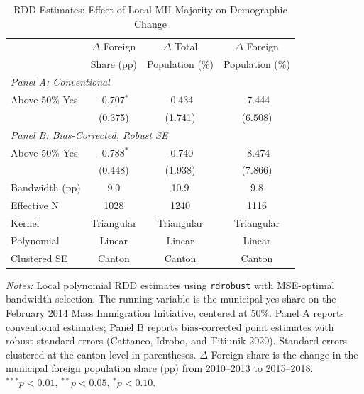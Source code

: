 \begin{table}[t]
\centering
\caption{RDD Estimates: Effect of Local MII Majority on Demographic Change}
\label{tab:main}
\begin{tabular}{lccc}
\hline\hline
 & $\Delta$ Foreign & $\Delta$ Total & $\Delta$ Foreign \\
 & Share (pp) & Population (\%) & Population (\%) \\
\hline
\multicolumn{4}{l}{\textit{Panel A: Conventional}} \\
[4pt]
Above 50\% Yes & -0.707$^{*}$ & -0.434 & -7.444 \\
 & (0.375) & (1.741) & (6.508) \\
[8pt]
\multicolumn{4}{l}{\textit{Panel B: Bias-Corrected, Robust SE}} \\
[4pt]
Above 50\% Yes & -0.788$^{*}$ & -0.740 & -8.474 \\
 & (0.448) & (1.938) & (7.866) \\
[4pt]
\hline
Bandwidth (pp) & 9.0 & 10.9 & 9.8 \\
Effective N & 1028 & 1240 & 1116 \\
Kernel & Triangular & Triangular & Triangular \\
Polynomial & Linear & Linear & Linear \\
Clustered SE & Canton & Canton & Canton \\
\hline\hline
\end{tabular}
\begin{tablenotes}[flushleft]
\small
\item \textit{Notes:} Local polynomial RDD estimates using \texttt{rdrobust} with MSE-optimal bandwidth selection. The running variable is the municipal yes-share on the February 2014 Mass Immigration Initiative, centered at 50\%. Panel A reports conventional estimates; Panel B reports bias-corrected point estimates with robust standard errors (Cattaneo, Idrobo, and Titiunik 2020). Standard errors clustered at the canton level in parentheses. $\Delta$ Foreign share is the change in the municipal foreign population share (pp) from 2010--2013 to 2015--2018. $^{***}p<0.01$, $^{**}p<0.05$, $^{*}p<0.10$.
\end{tablenotes}
\end{table}

